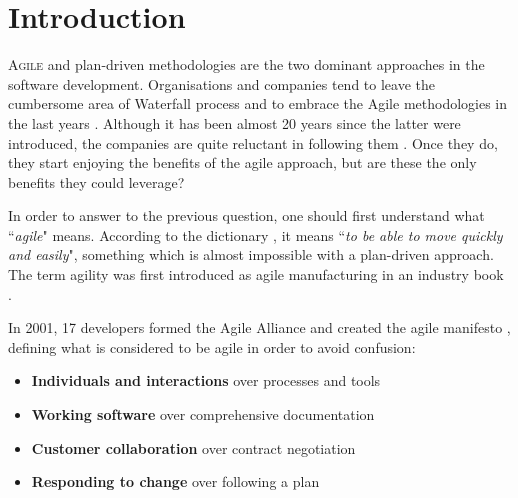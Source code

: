 \chapter{Introduction}
\label{ch:introduction}

\lettrine[lines=4, loversize=-0.1, lraise=0.1]{A}{gile} and plan-driven methodologies are the two dominant approaches in the software development. Organisations and companies tend to leave the cumbersome area of Waterfall process and to embrace the Agile methodologies in the last years \cite{laurie_williams}. Although it has been almost 20 years since the latter were introduced, the companies are quite reluctant in following them \cite{4599456}. Once they do, they start enjoying the benefits of the agile approach, but are these the only benefits they could leverage?

In order to answer to the previous question, one should first understand what ``\textit{agile}" means. According to the dictionary \cite{cambridge_dictionary}, it means ``\textit{to be able to move quickly and easily}", something which is almost impossible with a plan-driven approach. The term agility was first introduced as agile manufacturing in an industry book \cite{agile_manufacturing}.

In 2001, 17 developers formed the Agile Alliance and created the agile manifesto \cite{beck2001agile}, defining what is considered to be agile in order to avoid confusion: 
\begin{itemize}
	\item {\large \textbf{Individuals and interactions}} over processes and tools
	\item {\large \textbf{Working software}} over comprehensive documentation
	\item {\large \textbf{Customer collaboration}} over contract negotiation
	\item {\large \textbf{Responding to change}} over following a plan
\end{itemize}

